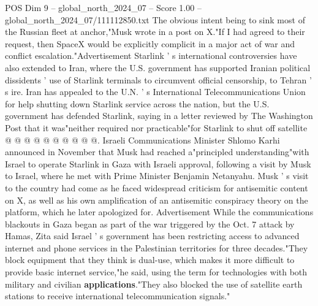 \begin{textsample}{POS Dim 9 – global\_north\_2024\_07 – Score 1.00 – global\_north\_2024\_07/111112850.txt}
The obvious intent being to sink most of the Russian fleet at anchor,"Musk wrote in a post on X."If I had agreed to their request, then SpaceX would be explicitly complicit in a major act of war and conflict escalation."Advertisement Starlink ' s international controversies have also extended to Iran, where the U.S. government has supported Iranian political dissidents ' use of Starlink terminals to circumvent official censorship, to Tehran ' s ire.
Iran has appealed to the U.N. ' s International Telecommunications Union for help shutting down Starlink service across the nation, but the U.S. government has defended Starlink, saying in a letter reviewed by The Washington Post that it was"neither required nor practicable"for Starlink to shut off satellite @ @ @ @ @ @ @ @ @ @.
Israeli Communications Minister Shlomo Karhi announced in November that Musk had reached a"principled understanding"with Israel to operate Starlink in Gaza with Israeli approval, following a visit by Musk to Israel, where he met with Prime Minister Benjamin Netanyahu.
Musk ' s visit to the country had come as he faced widespread criticism for antisemitic content on X, as well as his own amplification of an antisemitic conspiracy theory on the platform, which he later apologized for.
Advertisement While the communications blackouts in Gaza began as part of the war triggered by the Oct. 7 attack by Hamas, Zita said Israel ' s government has been restricting access to advanced internet and phone services in the Palestinian territories for three decades."They block equipment that they think is dual-use, which makes it more difficult to provide basic internet service,"he said, using the term for technologies with both military and civilian \textbf{applications}."They also blocked the use of satellite earth stations to receive international telecommunication signals."

\end{textsample}
